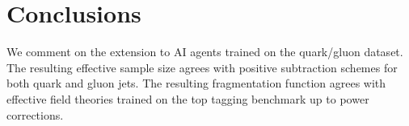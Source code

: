 \section{Conclusions}\label{sec:conclusions}

We comment on the extension to AI agents trained on the quark/gluon
dataset. The resulting effective sample size agrees with positive
subtraction schemes for both quark and gluon jets. The resulting
fragmentation function agrees with effective field theories trained on
the top tagging benchmark up to power corrections.

